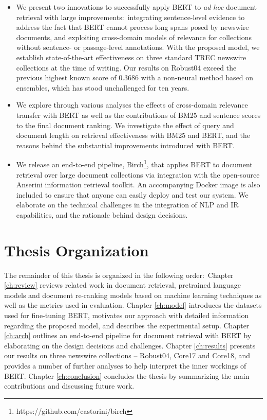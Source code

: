 \begin{itemize}
\item
We present two innovations to successfully apply BERT to \textit{ad hoc} document retrieval with large improvements:\
integrating sentence-level evidence to address the fact that BERT cannot process long spans posed by newswire documents, and exploiting cross-domain models of relevance for collections without sentence- or passage-level annotations.
With the proposed model, we establish state-of-the-art effectiveness on three standard TREC newswire collections at the time of writing.
Our results on Robust04 exceed the previous highest known score of 0.3686 \cite{Cormack:2009:RRF:1571941.1572114} with a non-neural method based on ensembles, which has stood unchallenged for ten years.
\item
We explore through various analyses the effects of cross-domain relevance transfer with BERT as well as the contributions of BM25 and sentence scores to the final document ranking.
We investigate the effect of query and document length on retrieval effectiveness with BM25 and BERT, and the reasons behind the substantial improvements introduced with BERT.
\item
We release an end-to-end pipeline, Birch\footnote{https://github.com/castorini/birch}, that applies BERT to document retrieval over large document collections via integration with the open-source Anserini information retrieval toolkit.
An accompanying Docker image is also included to ensure that anyone can easily deploy and test our system.
We elaborate on the technical challenges in the integration of NLP and IR capabilities, and the rationale behind design decisions.
\end{itemize}

\section{Thesis Organization}

The remainder of this thesis is organized in the following order:\
Chapter \ref{ch:review} reviews related work in document retrieval, pretrained language models and document re-ranking models based on machine learning techniques as well as the metrics used in evaluation.
Chapter \ref{ch:model} introduces the datasets used for fine-tuning BERT, motivates our approach with detailed information regarding the proposed model, and describes the experimental setup.
Chapter \ref{ch:arch} outlines an end-to-end pipeline for document retrieval with BERT by elaborating on the design decisions and challenges.
Chapter \ref{ch:results} presents our results on three newswire collections -- Robust04, Core17 and Core18, and provides a number of further analyses to help interpret the inner workings of BERT.
Chapter \ref{ch:conclusion} concludes the thesis by summarizing the main contributions and discussing future work.